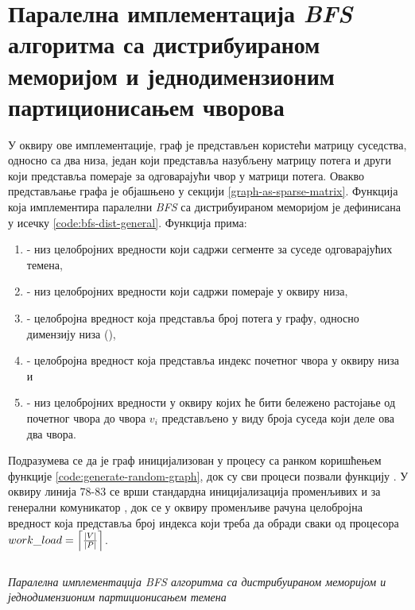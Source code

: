 \section{Паралелна имплементација \textit{BFS} алгоритма са дистрибуираном меморијом и једнодимензионим партиционисањем чворова}
У оквиру ове имплементације, граф је представљен користећи матрицу суседства, односно са два низа, један који представља назубљену матрицу потега и други који представља помераје за одговарајући чвор у матрици потега. Овакво представљање графа је објашњено у секцији \ref{graph-as-sparse-matrix}. Функција која имплементира паралелни \textit{BFS} са дистрибуираном меморијом је дефинисана у исечку \ref{code:bfs-dist-general}. Функција  прима:
\begin{enumerate}
    \item{} - низ целобројних вредности који садржи сегменте за суседе одговарајућих темена,
    \item{} - низ целобројних вредности који садржи помераје у оквиру низа,
    \item{} - целобројна вредност која представља број потега у графу, односно димензију низа (),
    \item{} - целобројна вредност која представља индекс почетног чвора у оквиру низа и
    \item{} - низ целобројних вредности у оквиру којих ће бити бележено растојање од почетног чвора  до чвора $v_i$ представљено у виду броја суседа који деле ова два чвора.
\end{enumerate}

\par
Подразумева се да је граф иницијализован у процесу са ранком  коришћењем функције \ref{code:generate-random-graph}, док су сви процеси позвали функцију . У оквиру линија 78-83 се врши стандардна иницијализација променљивих  и за генерални комуникатор , док се у оквиру променљиве  рачуна целобројна вредност која представља број индекса који треба да обради сваки од процесора $work\_load = \ceil*{\frac{|V|}{|P|}}$. 

\begin{listing}[H]
\centering
\inputminted[fontsize={\fontsize{5}{5}\selectfont},firstline=71,lastline=158]{c}{kodovi/bfs-dist-general-1d.c}
\caption{\textit{Паралелна имплементација \textit{BFS} алгоритма са дистрибуираном меморијом и једнодимензионим партиционисањем темена}}
\label{code:bfs-dist-general}
\end{listing}

